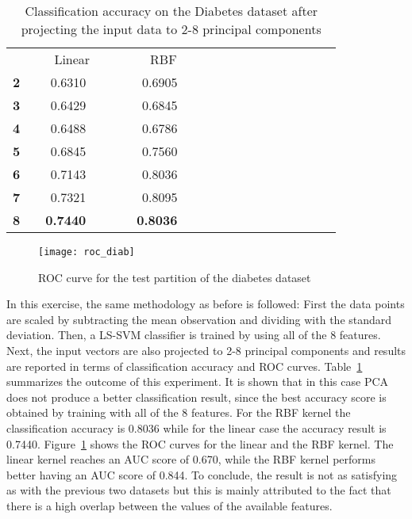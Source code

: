 \documentclass[conference,compsoc]{IEEEtran}
\begin{document}
\begin{table}\centering

\begin{tabular}{@{}rrrrrrrrrrccrrrcrrr@{}}\toprule
& \multicolumn{4}{c}{Linear} & \phantom{abc}& \multicolumn{2}{c}{RBF} &
\phantom{abc} \\

 \textbf{2}&   &    0.6310&   &&  & 0.6905 &  \\
  \textbf{3}&   &      0.6429&   &&  &  0.6845 &  \\
   \textbf{4}&   &      0.6488&   &&  & 0.6786 &  \\
   \textbf{5}&   &     0.6845&   &&  &    0.7560 &  \\
  \textbf{6}&   &  0.7143 &   &&  &        0.8036 &  \\
    \textbf{7}&   &     0.7321 &   &&  &       0.8095 &  \\
   \textbf{8}&   &  \textbf{ 0.7440} &   &&  &   \textbf{   0.8036} &  \\



\bottomrule
\end{tabular}
\caption{Classification accuracy on the Diabetes dataset after projecting the input data to 2-8 principal components}
       \label{fig:diabable}
\end{table} 

\begin{figure}[]
				\centering
            \texttt{[image: roc\_diab]}
      
        \caption{ ROC curve for the test partition of the diabetes dataset }        
                   
        \label{fig:rocdiab}
    \end{figure}


In this exercise, the same methodology as before is followed: First the data points are scaled by subtracting the mean observation and dividing with the standard deviation. Then, a LS-SVM classifier is trained by using all of the 8 features. Next, the input vectors are also projected to 2-8 principal components and results are reported in terms of classification accuracy and ROC curves. Table~\ref{fig:diabable} summarizes the outcome of this experiment. It is shown that in this case PCA does not produce a better classification result, since the best accuracy score is obtained by training with all of the 8 features. For the RBF kernel the classification accuracy is 0.8036 while for the linear case the accuracy result is 0.7440. Figure~\ref{fig:rocdiab} shows the ROC curves for the linear and the RBF kernel. The linear kernel reaches an AUC score of 0.670, while the RBF kernel performs better having an AUC score of 0.844. To conclude, the result is not as satisfying as with the previous two datasets but this is mainly attributed to the fact that there is a high overlap between the values of the available features. 
\end{document}

